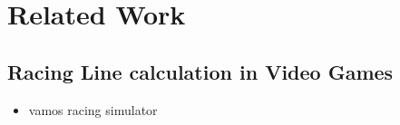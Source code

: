 \section{Related Work}
\label{sec:related_work}

\subsection{Racing Line calculation in Video Games}
\begin{itemize}
	\item vamos racing simulator
\end{itemize}
	\clearpage